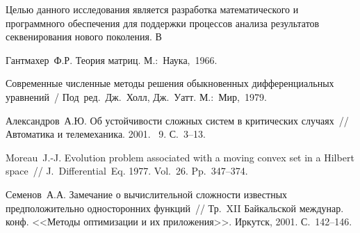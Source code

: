 \documentclass[12pt]{llncs}  %
\begin{document}
Целью данного исследования является разработка математического и программного обеспечения для поддержки процессов анализа результатов секвенирования нового поколения.  В






%

%

\begin{thebibliography}{9} %
 Гантмахер~Ф.Р. Теория матриц. М.:~Наука,~1966.

 Современные численные методы решения обыкновенных дифференциальных уравнений~/ Под~ред.~Дж.~Холл, Дж.~Уатт. М.:~Мир,~1979.

 Александров~А.Ю. Об устойчивости сложных систем в критических случаях~// Автоматика и телемеханика. 2001. \textnumero~9. С.~3--13.

 Moreau~J.-J. Evolution problem associated with a moving convex set in a Hilbert space~// J.~Differential~Eq. 1977. Vol.~26. Pp.~347--374.

 Семенов~А.А. Замечание о вычислительной сложности известных предположительно односторонних функций~// Тр.~XII Байкальской междунар. конф. <<Методы оптимизации и их приложения>>. Иркутск, 2001. С.~142--146.

\end{thebibliography}
\end{document}
